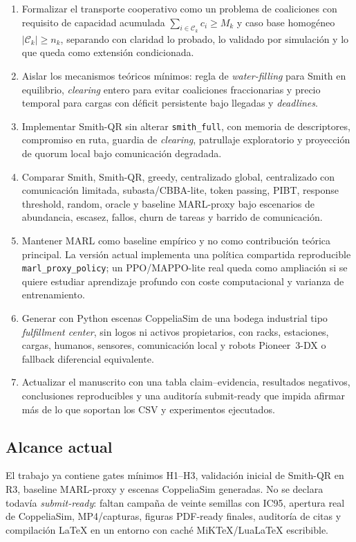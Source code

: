 \begin{enumerate}
  \item Formalizar el transporte cooperativo como un problema de coaliciones con
  requisito de capacidad acumulada $\sum_{i\in\mathcal{C}_k}c_i\geq M_k$ y caso base
  homogéneo $|\mathcal{C}_k|\geq n_k$, separando con claridad lo probado, lo validado
  por simulación y lo que queda como extensión condicionada.

  \item Aislar los mecanismos teóricos mínimos: regla de \emph{water-filling} para
  Smith en equilibrio, \emph{clearing} entero para evitar coaliciones fraccionarias y
  precio temporal para cargas con déficit persistente bajo llegadas y \emph{deadlines}.

  \item Implementar Smith-QR sin alterar \texttt{smith\_full}, con memoria de
  descriptores, compromiso en ruta, guardia de \emph{clearing}, patrullaje exploratorio
  y proyección de quorum local bajo comunicación degradada.

  \item Comparar Smith, Smith-QR, greedy, centralizado global, centralizado con
  comunicación limitada, subasta/CBBA-lite, token passing, PIBT, response threshold,
  random, oracle y baseline MARL-proxy bajo escenarios de abundancia, escasez, fallos,
  churn de tareas y barrido de comunicación.

  \item Mantener MARL como baseline empírico y no como contribución teórica principal.
  La versión actual implementa una política compartida reproducible
  \texttt{marl\_proxy\_policy}; un PPO/MAPPO-lite real queda como ampliación si se quiere
  estudiar aprendizaje profundo con coste computacional y varianza de entrenamiento.

  \item Generar con Python escenas CoppeliaSim de una bodega industrial tipo
  \emph{fulfillment center}, sin logos ni activos propietarios, con racks, estaciones,
  cargas, humanos, sensores, comunicación local y robots Pioneer~3-DX o fallback
  diferencial equivalente.

  \item Actualizar el manuscrito con una tabla claim--evidencia, resultados negativos,
  conclusiones reproducibles y una auditoría submit-ready que impida afirmar más de lo
  que soportan los CSV y experimentos ejecutados.
\end{enumerate}

\subsection{Alcance actual}

El trabajo ya contiene gates mínimos H1--H3, validación inicial de Smith-QR en R3,
baseline MARL-proxy y escenas CoppeliaSim generadas. No se declara todavía
\emph{submit-ready}: faltan campaña de veinte semillas con IC95, apertura real de
CoppeliaSim, MP4/capturas, figuras PDF-ready finales, auditoría de citas y compilación
LaTeX en un entorno con caché MiKTeX/LuaLaTeX escribible.
